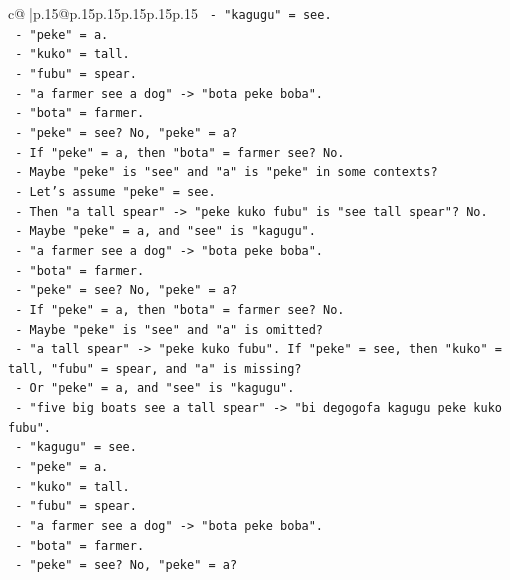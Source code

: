 \documentclass{article}
\begin{document}
{\begin{supertabular}{c@{$\;$}|p{.15\linewidth}@{}p{.15\linewidth}p{.15\linewidth}p{.15\linewidth}p{.15\linewidth}p{.15\linewidth}}
{{{\texttt{        {-} "kagugu" = see.} \\
\texttt{        {-} "peke" = a.} \\
\texttt{        {-} "kuko" = tall.} \\
\texttt{        {-} "fubu" = spear.} \\
\texttt{        {-} "a farmer see a dog" {-}> "bota peke boba".} \\
\texttt{        {-} "bota" = farmer.} \\
\texttt{        {-} "peke" = see? No, "peke" = a?} \\
\texttt{        {-} If "peke" = a, then "bota" = farmer see? No.} \\
\texttt{        {-} Maybe "peke" is "see" and "a" is "peke" in some contexts?} \\
\texttt{        {-} Let's assume "peke" = see.} \\
\texttt{        {-} Then "a tall spear" {-}> "peke kuko fubu" is "see tall spear"? No.} \\
\texttt{        {-} Maybe "peke" = a, and "see" is "kagugu".} \\
\texttt{        {-} "a farmer see a dog" {-}> "bota peke boba".} \\
\texttt{        {-} "bota" = farmer.} \\
\texttt{        {-} "peke" = see? No, "peke" = a?} \\
\texttt{        {-} If "peke" = a, then "bota" = farmer see? No.} \\
\texttt{        {-} Maybe "peke" is "see" and "a" is omitted?} \\
\texttt{        {-} "a tall spear" {-}> "peke kuko fubu". If "peke" = see, then "kuko" = tall, "fubu" = spear, and "a" is missing?} \\
\texttt{        {-} Or "peke" = a, and "see" is "kagugu".} \\
\texttt{        {-} "five big boats see a tall spear" {-}> "bi degogofa kagugu peke kuko fubu".} \\
\texttt{        {-} "kagugu" = see.} \\
\texttt{        {-} "peke" = a.} \\
\texttt{        {-} "kuko" = tall.} \\
\texttt{        {-} "fubu" = spear.} \\
\texttt{        {-} "a farmer see a dog" {-}> "bota peke boba".} \\
\texttt{        {-} "bota" = farmer.} \\
\texttt{        {-} "peke" = see? No, "peke" = a?} \\
}}}
\end{supertabular}}
\end{document}
